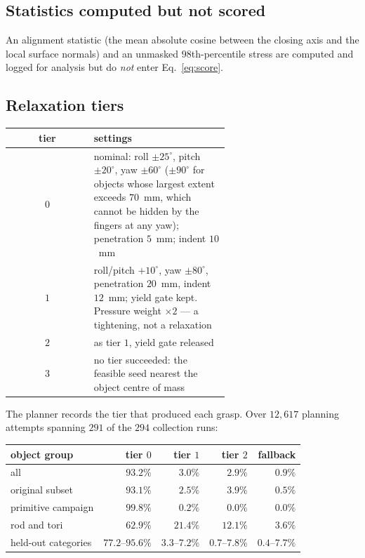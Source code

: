 \subsection{Statistics computed but not scored}
\label{app:synth:gates}
An alignment statistic (the mean absolute cosine between the closing axis and the local surface
normals) and an unmasked $98$th-percentile stress are computed and logged for analysis but do
\emph{not} enter Eq.~\eqref{eq:score}.

\subsection{Relaxation tiers}
\label{app:synth:tiers}
\begin{center}\footnotesize
\begin{tabular}{@{}cp{0.62\linewidth}@{}}
\toprule
tier & settings \\
\midrule
$0$ & nominal: roll $\pm25^\circ$, pitch $\pm20^\circ$, yaw $\pm60^\circ$ ($\pm90^\circ$ for objects
      whose largest extent exceeds $70$~mm, which cannot be hidden by the fingers at any yaw);
      penetration $5$~mm; indent $10$~mm \\
$1$ & roll/pitch $+10^\circ$, yaw $\pm80^\circ$, penetration $20$~mm, indent $12$~mm; yield gate
      kept. Pressure weight $\times 2$ --- a tightening, not a relaxation \\
$2$ & as tier $1$, yield gate released \\
$3$ & no tier succeeded: the feasible seed nearest the object centre of mass \\
\bottomrule
\end{tabular}
\end{center}

The planner records the tier that produced each grasp. Over $12{,}617$ planning attempts spanning
$291$ of the $294$ collection runs:

\begin{center}\footnotesize
\begin{tabular}{@{}lrrrr@{}}
\toprule
object group & tier $0$ & tier $1$ & tier $2$ & fallback \\
\midrule
all                 & $93.2\%$ & $3.0\%$  & $2.9\%$  & $0.9\%$ \\
original subset     & $93.1\%$ & $2.5\%$  & $3.9\%$  & $0.5\%$ \\
primitive campaign  & $99.8\%$ & $0.2\%$  & $0.0\%$  & $0.0\%$ \\
rod and tori        & $62.9\%$ & $21.4\%$ & $12.1\%$ & $3.6\%$ \\
held-out categories & $77.2$--$95.6\%$ & $3.3$--$7.2\%$ & $0.7$--$7.8\%$ & $0.4$--$7.7\%$ \\
\bottomrule
\end{tabular}
\end{center}

